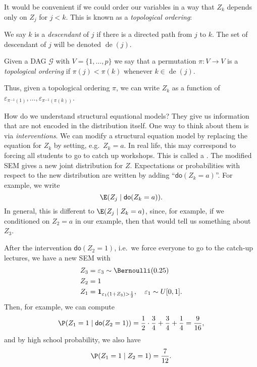 \documentclass[a4paper]{article}
\DeclareMathOperator\de{de}
\newcommand\ddo{\mathsf{do}}
\begin{document}
It would be convenient if we could order our variables in a way that $Z_k$ depends only on $Z_j$ for $j < k$. This is known as a \emph{topological ordering}:

\begin{defi}[Descendant]
  We say $k$ is a \emph{descendant} of $j$ if there is a directed path from $j$ to $k$. The set of descendant of $j$ will be denoted $\de(j)$.
\end{defi}

\begin{defi}
  Given a DAG $\mathcal{G}$ with $V = \{1, \ldots, p\}$ we say that a permutation $\pi: V \to V$ is a \emph{topological ordering} if $\pi(j) < \pi(k)$ whenever $k \in \de(j)$.
\end{defi}

Thus, given a topological ordering $\pi$, we can write $Z_k$ as a function of $\varepsilon_{\pi^{-1}(1)}, \ldots, \varepsilon_{\pi^{-1}(\pi(k))}$.

How do we understand structural equational models? They give us information that are not encoded in the distribution itself. One way to think about them is via \emph{interventions}. We can modify a structural equation model by replacing the equation for $Z_k$ by setting, e.g.\ $Z_k = a$. In real life, this may correspond to forcing all students to go to catch up workshops. This is called a . The modified SEM gives a new joint distribution for $Z$. Expectations or probabilities with respect to the new distribution are written by adding ``$\ddo(Z_k = a)$''. For example, we write
\[
  \E(Z_j \mid \ddo(Z_k = a)).
\]
In general, this is different to $\E(Z_j \mid Z_k = a)$, since, for example, if we conditioned on $Z_2 = a$ in our example, then that would tell us something about $Z_3$.

\begin{eg}
  After the intervention $\ddo(Z_2 = 1)$, i.e.\ we force everyone to go to the catch-up lectures, we have a new SEM with
  \begin{align*}
    Z_3 &= \varepsilon_3 \sim \Bernoulli(0.25)\\
    Z_2 &= 1\\
    Z_1 &= \mathbf{1}_{\varepsilon_1 (1 + Z_3) > \frac{1}{2}}, \quad \varepsilon_1 \sim U[0, 1].
  \end{align*}
  Then, for example, we can compute
  \[
    \P(Z_1 = 1 \mid \ddo(Z_2 = 1)) = \frac{1}{2} \cdot \frac{3}{4} + \frac{3}{4} + \frac{1}{4} = \frac{9}{16},
  \]
  and by high school probability, we also have
  \[
    \P(Z_1 = 1 \mid Z_2 = 1) = \frac{7}{12}.
  \]
\end{eg}
\end{document}
